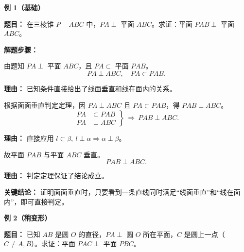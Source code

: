 \begin{examplebox}
	\textbf{\textcolor{CExample}{例 1（基础）}}

	\medskip
	\textbf{\textcolor{CExample}{题目：}}
	在三棱锥 $P-ABC$ 中，$PA\perp$ 平面 $ABC$。求证：平面 $PAB\perp$ 平面 $ABC$。

	\medskip
	\textbf{\textcolor{CExample}{解题步骤：}}
	\begin{description}[style=nextline, leftmargin=2.8em, labelsep=0.5em, itemsep=0.45em]
		\item[\textbf{第一步（识别条件）：}]
			由题知 $PA\perp$ 平面 $ABC$，且 $PA\subset$ 平面 $PAB$。
			\[
				PA\perp ABC,\quad PA\subset PAB.
			\]
			\par\textbf{理由：} 已知条件直接给出了线面垂直和线在面内的关系。
		\item[\textbf{第二步（套用定理）：}]
			根据面面垂直判定定理，因 $PA\perp ABC$ 且 $PA\subset PAB$，得 $PAB\perp ABC$。
			\[
				\left.
				\begin{aligned}
					PA &\subset PAB\\PA &\perp ABC
			\end{aligned}
				\right\}\ \Rightarrow\ PAB\perp ABC.
			\]
			\par\textbf{理由：} 直接应用 $l\subset\beta,\ l\perp\alpha \Rightarrow \alpha\perp\beta$。
		\item[\textbf{第三步（得出结论）：}]
			故平面 $PAB$ 与平面 $ABC$ 垂直。
			\[
				PAB\perp ABC.
			\]
			\par\textbf{理由：} 判定定理保证了结论成立。
	\end{description}

	\medskip
	\textbf{\textcolor{CExample}{关键结论：}}
	证明面面垂直时，只要看到一条直线同时满足“线面垂直”和“线在面内”，即可直接判定。

	\medskip
	\textbf{\textcolor{CExample}{例 2（稍变形）}}

	\medskip
	\textbf{\textcolor{CExample}{题目：}}
	已知 $AB$ 是圆 $O$ 的直径，$PA\perp$ 圆 $O$ 所在平面，$C$ 是圆上一点（$C\neq A,B$）。求证：平面 $PAC\perp$ 平面 $PBC$。


\end{examplebox}
